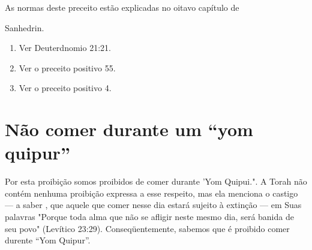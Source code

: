 As normas deste preceito estão explicadas no oitavo capítulo de


Sanhedrin.


\begin{enumerate}
\def\labelenumi{\arabic{enumi}.}
\setcounter{enumi}{365}
\item
 
 Ver Deuterdnomio 21:21.
 
\item
 
 Ver o preceito positivo 55.
 
\item
 
 Ver o preceito positivo 4.
 
\end{enumerate}



\section{Não comer durante um ``yom quipur''}

Por esta proibição somos proibidos de comer durante 'Yom
Qui­pui.". A Torah não contém nenhuma proibição
expressa a esse respeito, mas ela menciona o castigo --- a saber , que
aquele que comer nesse dia estará sujei­to à extinção --- em Suas
palavras "Porque toda alma que não se afligir neste mesmo dia, será
banida de seu povo" (Levítico 23:29). Conseqüentemente, sa­bemos que é
proibido comer durente ``Yom Quipur''.


